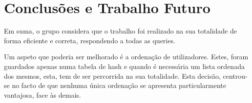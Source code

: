 \documentclass[10pt,a4paper]{article}
\begin{document}
\section{Conclusões e Trabalho Futuro}
    Em suma, o grupo considera que o trabalho foi realizado na sua
    totalidade de forma eficiente e correta, respondendo a todas as queries.

    Um aspeto que poderia ser melhorado é a ordenação de utilizadores. Estes,
    foram guardados apenas numa tabela de hash e quando é necessária um lista
    ordenada dos mesmos, esta, tem de ser percorrida na sua totalidade. Esta
    decisão, centrou-se no facto de que nenhuma única ordenação se apresenta
    particularmente vantajosa, face às demais.
\end{document}
